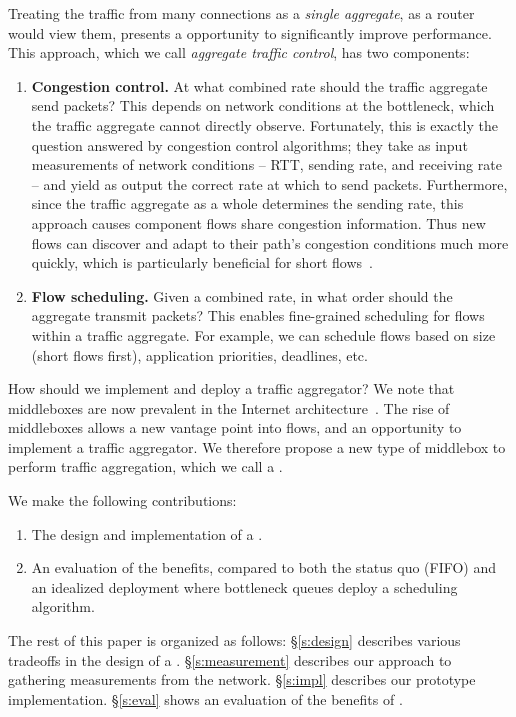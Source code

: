 Treating the traffic from many connections as a \emph{single aggregate}, \ie as a router would view them, presents a opportunity to significantly improve performance. This approach, which we call {\em aggregate traffic control}, has two components: 
\begin{enumerate}
    \item {\bf Congestion control.} At what combined rate should the traffic aggregate send packets? This depends on network conditions at the bottleneck, which the traffic aggregate cannot directly observe. 
    Fortunately, this is exactly the question answered by congestion control algorithms; they take as input measurements of network conditions -- RTT, sending rate, and receiving rate -- and yield as output the correct rate at which to send packets.
    Furthermore, since the traffic aggregate as a whole determines the sending rate, this approach causes component flows share congestion information.
    Thus new flows can discover and adapt to their path's congestion conditions much more quickly, which is particularly beneficial for short flows~\cite{CM}. 
    
    \item {\bf Flow scheduling.} Given a combined rate, in what order should the aggregate transmit packets?  This enables fine-grained scheduling for flows within a traffic aggregate. 
    For example, we can schedule flows based on size (short flows first), application priorities, deadlines, etc.
\end{enumerate}

How should we implement and deploy a traffic aggregator? 
We note that middleboxes are now prevalent in the Internet architecture~\cite{aplomb}.
The rise of middleboxes allows a new vantage point into flows, and an opportunity to implement a traffic aggregator.
We therefore propose a new type of middlebox to perform traffic aggregation, which we call a \name.

We make the following contributions:
\begin{enumerate}
    \item The design and implementation of a \name.
    \item An evaluation of the benefits, compared to both the status quo (FIFO) and an idealized deployment where bottleneck queues deploy a scheduling algorithm.
\end{enumerate}

The rest of this paper is organized as follows: 
\S\ref{s:design} describes various tradeoffs in the design of a \name. 
\S\ref{s:measurement} describes our approach to gathering measurements from the network. 
\S\ref{s:impl} describes our prototype implementation. 
\S\ref{s:eval} shows an evaluation of the benefits of \name.

